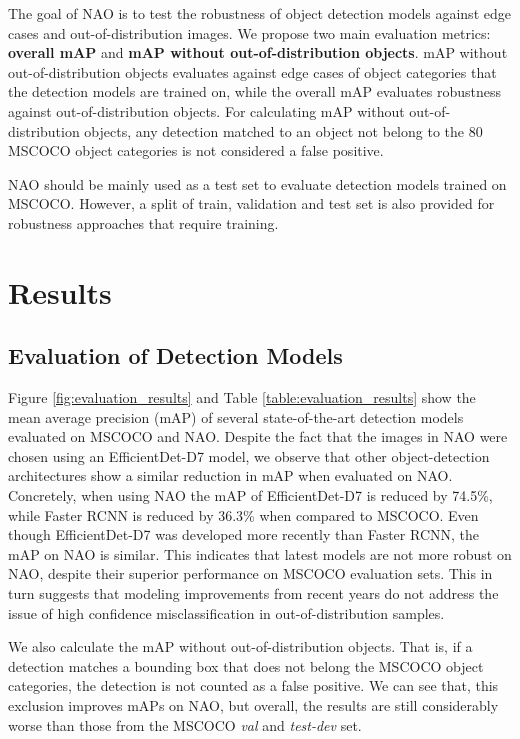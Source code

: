 \documentclass[final]{cvpr}
\begin{document}
The goal of NAO is to test the robustness of object detection models against edge cases and out-of-distribution images. We propose two main evaluation metrics: \textbf{overall mAP} and \textbf{mAP without out-of-distribution objects}. mAP without out-of-distribution objects evaluates against edge cases of object categories that the detection models are trained on, while the overall mAP evaluates robustness against out-of-distribution objects. For calculating mAP without out-of-distribution objects, any detection matched to an object not belong to the 80 MSCOCO object categories is not considered a false positive.

NAO should be mainly used as a test set to evaluate detection models trained on MSCOCO. However, a split of train, validation and test set is also provided for robustness approaches that require training.



\section{Results}

\subsection{Evaluation of Detection Models}

Figure \ref{fig:evaluation_results} and Table \ref{table:evaluation_results} show the mean average precision (mAP) of several state-of-the-art detection models evaluated on MSCOCO and NAO. Despite the fact that the images in NAO were chosen using an EfficientDet-D7  model, we observe that other object-detection architectures show a similar reduction in mAP when evaluated on NAO. Concretely, when using NAO the mAP of EfficientDet-D7 is reduced by 74.5\%, while Faster RCNN is reduced by 36.3\% when compared to MSCOCO. Even though EfficientDet-D7 was developed more recently than Faster RCNN, the mAP on NAO is similar. This indicates that latest models are not more robust on NAO, despite their superior performance on MSCOCO evaluation sets.  This in turn suggests that modeling improvements from recent years do not address the issue of high confidence misclassification in out-of-distribution samples.

We also calculate the mAP without out-of-distribution objects. That is, if a detection matches a bounding box that does not belong the MSCOCO object categories, the detection is not counted as a false positive. We can see that, this exclusion improves mAPs on NAO, but overall, the results are still considerably worse than those from the MSCOCO \textit{val} and \textit{test-dev} set.
\end{document}

